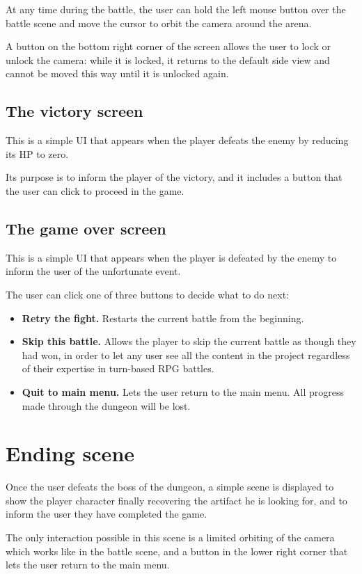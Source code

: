 At any time during the battle, the user can hold the left mouse button over the battle scene and move the cursor to orbit the camera around the arena.

A button on the bottom right corner of the screen allows the user to lock or unlock the camera: while it is locked, it returns to the default side view and cannot be moved this way until it is unlocked again.

\subsection{The victory screen}

This is a simple UI that appears when the player defeats the enemy by reducing its HP to zero.

Its purpose is to inform the player of the victory, and it includes a button that the user can click to proceed in the game.

\subsection{The game over screen}

This is a simple UI that appears when the player is defeated by the enemy to inform the user of the unfortunate event.

The user can click one of three buttons to decide what to do next:

\begin{itemize}
    \item \textbf{Retry the fight.} Restarts the current battle from the beginning.
    \item \textbf{Skip this battle.} Allows the player to skip the current battle as though they had won, in order to let any user see all the content in the project regardless of their expertise in turn-based RPG battles.
    \item \textbf{Quit to main menu.} Lets the user return to the main menu. All progress made through the dungeon will be lost.
\end{itemize}

\section{Ending scene}

Once the user defeats the boss of the dungeon, a simple scene is displayed to show the player character finally recovering the artifact he is looking for, and to inform the user they have completed the game.

The only interaction possible in this scene is a limited orbiting of the camera which works like in the battle scene, and a button in the lower right corner that lets the user return to the main menu.